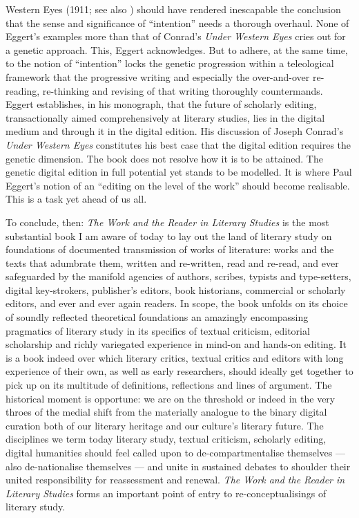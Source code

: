 \begin{review}
{Western Eyes} (1911; see also \citealt{conrad_under_2013}) should have rendered inescapable the conclusion
that the sense and significance of ``intention'' needs a thorough
overhaul. None of Eggert's examples more than that of Conrad's
\emph{Under Western Eyes} cries out for a genetic approach. This, Eggert
acknowledges. But to adhere, at the same time, to the notion of
``intention'' locks the genetic progression within a teleological
framework that the progressive writing and especially the over-and-over
re-reading, re-thinking and revising of that writing thoroughly
countermands. Eggert establishes, in his monograph, that the future of
scholarly editing, transactionally aimed comprehensively at literary
studies, lies in the digital medium and through it in the digital
edition. His discussion of Joseph Conrad's \emph{Under Western Eyes}
constitutes his best case that the digital edition requires the genetic
dimension. The book does not resolve how it is to be attained. The
genetic digital edition in full potential yet stands to be modelled. It
is where Paul Eggert's notion of an ``editing on the level of the work''
should become realisable. This is a task yet ahead of us all.

To conclude, then: \emph{The Work and the Reader in Literary Studies} is
the most substantial book I am aware of today to lay out the land of
literary study on foundations of documented transmission of works of
literature: works and the texts that adumbrate them, written and
re-written, read and re-read, and ever safeguarded by the manifold
agencies of authors, scribes, typists and type-setters, digital
key-strokers, publisher's editors, book historians, commercial or
scholarly editors, and ever and ever again readers. In scope, the book
unfolds on its choice of soundly reflected theoretical foundations an
amazingly encompassing pragmatics of literary study in its specifics of
textual criticism, editorial scholarship and richly variegated
experience in mind-on and hands-on editing. It is a book indeed over
which literary critics, textual critics and editors with long experience
of their own, as well as early researchers, should ideally get together
to pick up on its multitude of definitions, reflections and lines of
argument. The historical moment is opportune: we are on the threshold or
indeed in the very throes of the medial shift from the materially
analogue to the binary digital curation both of our literary heritage
and our culture's literary future. The disciplines we term today
literary study, textual criticism, scholarly editing, digital humanities
should feel called upon to de-compartmentalise themselves --- also
de-nationalise themselves --- and unite in sustained debates to shoulder
their united responsibility for reassessment and renewal. \emph{The Work
and the Reader in Literary Studies} forms an important point of entry to
re-conceptualisings of literary study.

\begin{flushleft}
  
\end{flushleft}

\end{review}